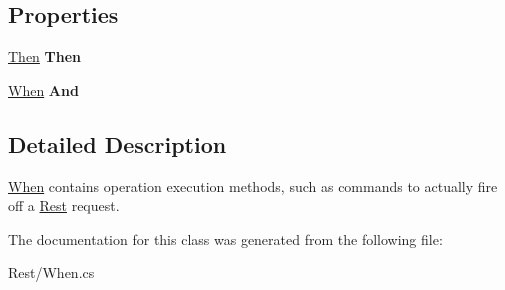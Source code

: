 \subsection*{Properties}
\begin{DoxyCompactItemize}
\item 
\hypertarget{class_proto_test_1_1_golem_1_1_rest_1_1_when_ac6b6ddaebb90c9bd66c3c800542378ef}{\hyperlink{class_proto_test_1_1_golem_1_1_rest_1_1_then}{Then} {\bfseries Then}}\label{class_proto_test_1_1_golem_1_1_rest_1_1_when_ac6b6ddaebb90c9bd66c3c800542378ef}

\item 
\hypertarget{class_proto_test_1_1_golem_1_1_rest_1_1_when_a31d5e6eaab5f607b7ee4c1716fff57de}{\hyperlink{class_proto_test_1_1_golem_1_1_rest_1_1_when}{When} {\bfseries And}}\label{class_proto_test_1_1_golem_1_1_rest_1_1_when_a31d5e6eaab5f607b7ee4c1716fff57de}

\end{DoxyCompactItemize}


\subsection{Detailed Description}
\hyperlink{class_proto_test_1_1_golem_1_1_rest_1_1_when}{When} contains operation execution methods, such as commands to actually fire off a \hyperlink{namespace_proto_test_1_1_golem_1_1_rest}{Rest} request. 



The documentation for this class was generated from the following file\-:\begin{DoxyCompactItemize}
\item 
Rest/When.\-cs\end{DoxyCompactItemize}
